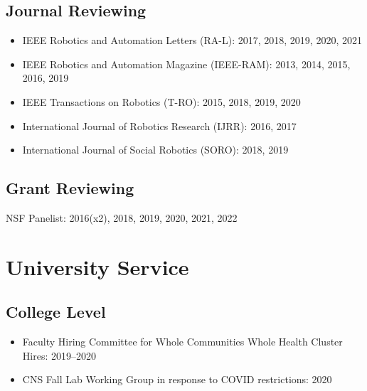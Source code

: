 \documentclass[Times]{article}
\begin{document}
\subsection*{Journal Reviewing}
\begin{itemize}
  \item IEEE Robotics and Automation Letters (RA-L): 2017, 2018, 2019, 2020, 2021
\item IEEE Robotics and Automation Magazine (IEEE-RAM): 2013, 2014, 2015, 2016, 2019
  \item IEEE Transactions on Robotics (T-RO): 2015, 2018, 2019, 2020
  \item International Journal of Robotics Research (IJRR): 2016, 2017
  \item International Journal of Social Robotics (SORO): 2018, 2019
\end{itemize}

\subsection*{Grant Reviewing}

NSF Panelist: 2016(x2), 2018, 2019, 2020, 2021, 2022


\section*{University Service}
\subsection*{College Level}
\begin{itemize}
  \item Faculty Hiring Committee for Whole Communities Whole Health Cluster
    Hires: 2019--2020
  \item CNS Fall Lab Working Group in response to COVID restrictions: 2020
\end{itemize}
\end{document}
